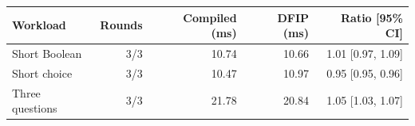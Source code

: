 \begin{tabular}{lrrrr}
\toprule
Workload & Rounds & Compiled (ms) & DFIP (ms) & Ratio [95\% CI] \\
\midrule
Short Boolean & 3/3 & 10.74 & 10.66 & 1.01 [0.97, 1.09] \\
Short choice & 3/3 & 10.47 & 10.97 & 0.95 [0.95, 0.96] \\
Three questions & 3/3 & 21.78 & 20.84 & 1.05 [1.03, 1.07] \\
\bottomrule
\end{tabular}
